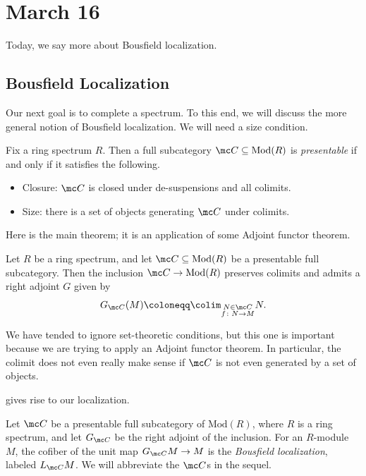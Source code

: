 \documentclass[../notes.tex]{subfiles}
\begin{document}
\section{March 16}
Today, we say more about Bousfield localization.

\subsection{Bousfield Localization}
Our next goal is to complete a spectrum. To this end, we will discuss the more general notion of Bousfield localization. We will need a size condition.
\begin{definition}[presentable]
	Fix a ring spectrum $R$. Then a full subcategory $\mc C\subseteq\mathrm{Mod}(R)$ is \textit{presentable} if and only if it satisfies the following.
	\begin{itemize}
		\item Closure: $\mc C$ is closed under de-suspensions and all colimits.
		\item Size: there is a set of objects generating $\mc C$ under colimits.
	\end{itemize}
\end{definition}
Here is the main theorem; it is an application of some Adjoint functor theorem.
\begin{theorem} \label{thm:bousfield-localization}
	Let $R$ be a ring spectrum, and let $\mc C\subseteq\mathrm{Mod}(R)$ be a presentable full subcategory. Then the inclusion $\mc C\to\mathrm{Mod}(R)$ preserves colimits and admits a right adjoint $G$ given by
	\[G_{\mc C}(M)\coloneqq\colim_{\substack{N\in\mc C\\f\colon N\to M}}N.\]
\end{theorem}
\begin{remark}
	We have tended to ignore set-theoretic conditions, but this one is important because we are trying to apply an Adjoint functor theorem. In particular, the colimit does not even really make sense if $\mc C$ is not even generated by a set of objects.
\end{remark}
 gives rise to our localization.
\begin{definition}
	Let $\mc C$ be a presentable full subcategory of $\mathrm{Mod}(R)$, where $R$ is a ring spectrum, and let $G_{\mc C}$ be the right adjoint of the inclusion. For an $R$-module $M$, the cofiber of the unit map $G_{\mc C}M\to M$ is the \textit{Bousfield localization}, labeled $L_{\mc C}M$. We will abbreviate the $\mc C$s in the sequel.
\end{definition}
\end{document}
